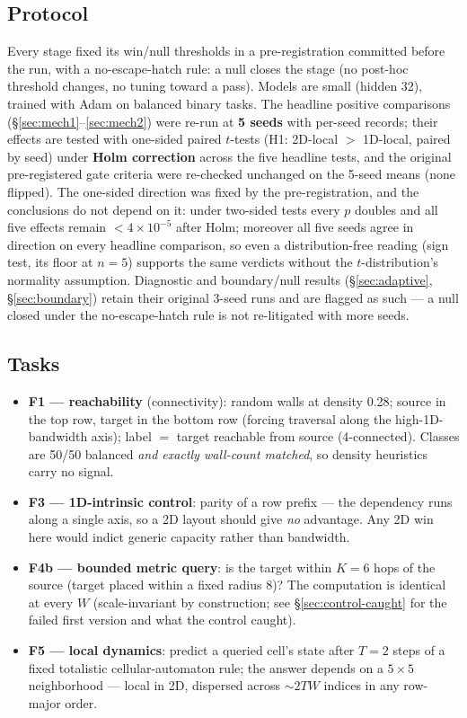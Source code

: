 \documentclass[11pt]{article}
\begin{document}
\subsection{Protocol}\label{sec:protocol}

Every stage fixed its win/null thresholds in a pre-registration committed
before the run, with a no-escape-hatch rule: a null closes the stage (no
post-hoc threshold changes, no tuning toward a pass). Models are small (hidden
32), trained with Adam on balanced binary tasks. The headline positive
comparisons (\S\ref{sec:mech1}--\ref{sec:mech2}) were re-run at \textbf{5
seeds} with per-seed records; their effects are tested with one-sided paired
$t$-tests (H1: 2D-local $>$ 1D-local, paired by seed) under \textbf{Holm
correction} across the five headline tests, and the original pre-registered
gate criteria were re-checked unchanged on the 5-seed means (none flipped).
The one-sided direction was fixed by the pre-registration, and the
conclusions do not depend on it: under two-sided tests every $p$ doubles and
all five effects remain $< 4\times10^{-5}$ after Holm; moreover all five
seeds agree in direction on every headline comparison, so even a
distribution-free reading (sign test, its floor at $n = 5$) supports the same
verdicts without the $t$-distribution's normality assumption.
Diagnostic and boundary/null results (\S\ref{sec:adaptive},
\S\ref{sec:boundary}) retain their original 3-seed runs and are flagged as
such --- a null closed under the no-escape-hatch rule is not re-litigated with
more seeds.

\subsection{Tasks}\label{sec:tasks}

\begin{itemize}
\item \textbf{F1 --- reachability} (connectivity): random walls at density
  0.28; source in the top row, target in the bottom row (forcing traversal
  along the high-1D-bandwidth axis); label $=$ target reachable from source
  (4-connected). Classes are 50/50 balanced \emph{and exactly wall-count
  matched}, so density heuristics carry no signal.
\item \textbf{F3 --- 1D-intrinsic control}: parity of a row prefix --- the
  dependency runs along a single axis, so a 2D layout should give \emph{no}
  advantage. Any 2D win here would indict generic capacity rather than
  bandwidth.
\item \textbf{F4b --- bounded metric query}: is the target within $K = 6$
  hops of the source (target placed within a fixed radius 8)? The computation
  is identical at every $W$ (scale-invariant by construction; see
  \S\ref{sec:control-caught} for the failed first version and what the
  control caught).
\item \textbf{F5 --- local dynamics}: predict a queried cell's state after
  $T = 2$ steps of a fixed totalistic cellular-automaton rule; the answer
  depends on a $5\times5$ neighborhood --- local in 2D, dispersed across
  $\sim 2TW$ indices in any row-major order.
\end{itemize}
\end{document}
